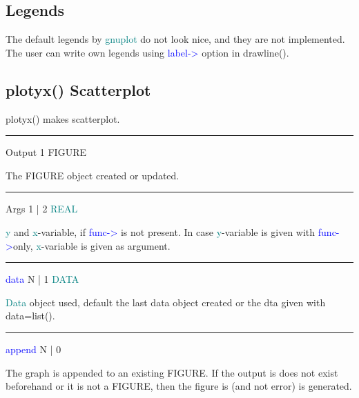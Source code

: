 \subsection{Legends} 
\label{legend} 
\item The default legends by \textcolor{teal}{gnuplot} do not look nice, and they are not implemented. 
The user can write own legends using \textcolor{blue}{label->} option in \textcolor{VioletRed}{drawline}(). 
\subsection{\textcolor{VioletRed}{plotyx}() Scatterplot} 
\label{plotyx} 
\textcolor{VioletRed}{plotyx}() makes scatterplot. 
\vspace{0.3cm} 
\hrule 
\vspace{0.3cm} 
\noindent Output  \tabto{3cm}  1 \tabto{5cm}   FIGURE  \tabto{7cm} 
\begin{changemargin}{3cm}{0cm} 
\noindent  The FIGURE object created or updated. 
\end{changemargin} 
\vspace{0.3cm} 
\hrule 
\vspace{0.3cm} 
\noindent Args  \tabto{3cm}  1 | 2  \tabto{5cm}   \textcolor{teal}{REAL}  \tabto{7cm} 
\begin{changemargin}{3cm}{0cm} 
\noindent  \textcolor{teal}{y} and \textcolor{teal}{x}-variable, if \textcolor{blue}{func->} is not present. 
In case \textcolor{teal}{y}-variable is given with \textcolor{blue}{func->}only,  \textcolor{teal}{x}-variable is given as argument. 
\end{changemargin} 
\vspace{0.3cm} 
\hrule 
\vspace{0.3cm} 
\noindent \textcolor{blue}{data}  \tabto{3cm}  N | 1  \tabto{5cm}   \textcolor{teal}{DATA}  \tabto{7cm} 
\begin{changemargin}{3cm}{0cm} 
\noindent  \textcolor{teal}{Data} object used, default the last data object created or the dta given 
with data=\textcolor{VioletRed}{list}(). 
\end{changemargin} 
\vspace{0.3cm} 
\hrule 
\vspace{0.3cm} 
\noindent \textcolor{blue}{append} \tabto{3cm} N | 0  \tabto{5cm}    \tabto{7cm} 
\begin{changemargin}{3cm}{0cm} 
\noindent  The graph is appended to an existing FIGURE. If the output is does not exist 
beforehand or it is not a FIGURE, then the figure is (and not error) is generated. 
\end{changemargin} 
